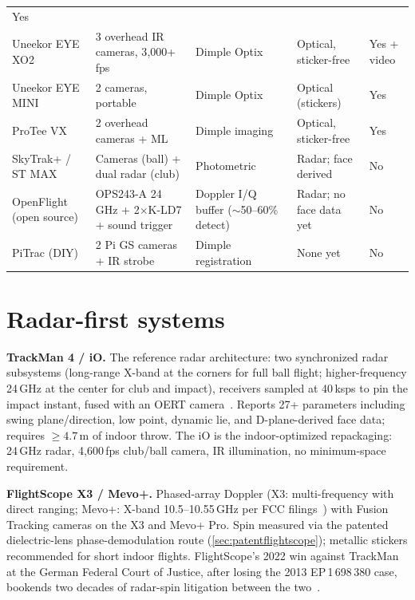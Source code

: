 \begin{table}[htbp]
\begin{tabular}{@{}p{2.6cm}p{3.3cm}p{2.6cm}p{2.9cm}p{2.9cm}@{}}
  Yes \\
Uneekor EYE XO2 & 3 overhead IR cameras, 3{,}000+\,fps & Dimple Optix &
  Optical, sticker-free & Yes + video \\
Uneekor EYE MINI & 2 cameras, portable & Dimple Optix & Optical
  (stickers) & Yes \\
ProTee VX & 2 overhead cameras + ML & Dimple imaging & Optical,
  sticker-free & Yes \\
SkyTrak+ / ST MAX & Cameras (ball) + dual radar (club) & Photometric &
  Radar; face derived & No \\
OpenFlight (open source) & OPS243-A 24\,GHz + 2$\times$K-LD7 + sound trigger &
  Doppler I/Q buffer ($\sim$50--60\% detect) & Radar; no face data yet &
  No \\
PiTrac (DIY) & 2 Pi GS cameras + IR strobe & Dimple registration &
  None yet & No \\
\bottomrule
\end{tabular}
\end{table}

\section{Radar-first systems}

\textbf{TrackMan 4 / iO.} The reference radar architecture: two
synchronized radar subsystems (long-range X-band at the corners for full
ball flight; higher-frequency 24\,GHz at the center for club and impact),
receivers sampled at 40\,ksps to pin the impact instant, fused with an
OERT camera~\cite{fccTman4,trackmanoert,trackmanspecs}. Reports 27+
parameters including swing plane/direction, low point, dynamic lie, and
D-plane-derived face data; requires $\ge4.7$\,m of indoor throw. The iO is
the indoor-optimized repackaging: 24\,GHz radar, 4,600\,fps club/ball
camera, IR illumination, no minimum-space requirement.

\textbf{FlightScope X3 / Mevo+.} Phased-array Doppler (X3:
multi-frequency with direct ranging; Mevo+: X-band 10.5--10.55\,GHz per
FCC filings~\cite{mevoteardown}) with Fusion Tracking cameras on the X3
and Mevo+ Pro. Spin measured via the patented dielectric-lens
phase-demodulation route (\cref{sec:patentflightscope}); metallic
stickers recommended for short indoor flights. FlightScope's 2022 win
against TrackMan at the German Federal Court of Justice, after losing the
2013 EP\,1\,698\,380 case, bookends two decades of radar-spin litigation
between the two~\cite{flightscopebgh}.

